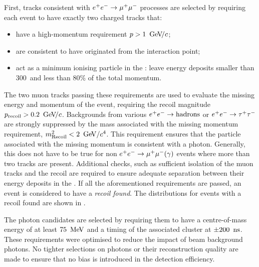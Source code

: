 First, tracks consistent with $e^+e^-\rightarrow\mu^+\mu^-$ processes are selected by requiring each event to have exactly two charged tracks that:
\begin{itemize}
    \item have a high-momentum requirement $p>1~{\mathrm{\,Ge\kern -0.1em V\!/}c}$;
    \item are consistent to have originated from the interaction point;
    \item act as a minimum ionising particle in the \ECL: leave energy deposits smaller than 300~\mev and less than 80\% of the total momentum.
\end{itemize}
The two muon tracks passing these requirements are used to evaluate the missing energy and momentum of the event, requiring the recoil magnitude $p_{\mathrm{recoil}}>0.2~{\mathrm{\,Ge\kern -0.1em V\!/}c}$.
Backgrounds from various $e^+e^-\rightarrow\mathrm{hadrons}$ or $e^+e^-\rightarrow\tau^+\tau^-$ are strongly suppressed by the mass associated with the missing momentum requirement,
$m^2_{\mathrm{Recoil}}<2~\mathrm{\,Ge\kern -0.1em V}/c^4$.
This requirement ensures that the particle associated with the missing momentum is consistent with a photon.
Generally, this does not have to be true for non $e^+e^-\rightarrow\mu^+\mu^-(\gamma)$ events where more than two tracks are present.
Additional checks, such as sufficient isolation of the muon tracks and the recoil are required to ensure adequate separation between their energy deposits in the \ECL.
If all the aforementioned requirements are passed, an event is considered to have a \textit{recoil found}.
The distributions for events with a recoil found are shown in .

The photon candidates are selected by requiring them to have a centre-of-mass energy of at least $75~\mathrm{\,Me\kern -0.1em V}$ and a timing of the associated cluster at $\pm200~{\rm \,ns}$.
These requirements were optimised to reduce the impact of beam background photons.
No tighter selections on photons or their reconstruction quality are made to ensure that no bias is introduced in the detection efficiency.

